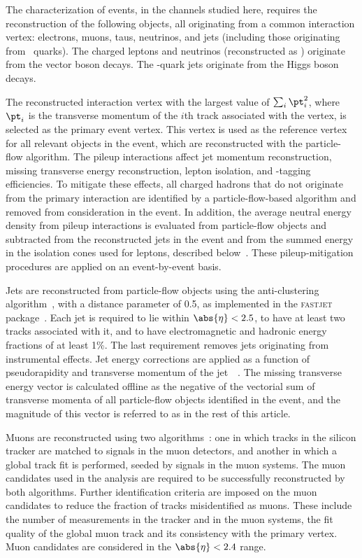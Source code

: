 \documentclass[12pt,twoside,a4paper,cmspaper,final,collab]{cms-tdr}
\begin{document}
The characterization of \VH events, in the channels studied here,
requires the reconstruction of the following objects, all originating from a common interaction vertex:
electrons, muons, taus, neutrinos, and jets (including those originating from \cPqb\ quarks). The charged leptons
and neutrinos (reconstructed as \MET) originate
from the vector boson decays. The \cPqb-quark jets originate from the Higgs boson decays.

The reconstructed interaction vertex with the largest value of
$\sum_i {\pt}_i^2$, where ${\pt}_i$ is the transverse momentum of
the $i$th track associated with the vertex, is selected as the primary event vertex. This vertex is used as the
reference vertex
for all relevant objects in the event, which are reconstructed with
the particle-flow algorithm. The pileup interactions affect jet momentum
reconstruction, missing transverse energy reconstruction,
lepton isolation, and \cPqb-tagging efficiencies.
To mitigate these effects,  all charged hadrons that do not
originate from the primary interaction are identified by a
particle-flow-based algorithm and removed from consideration in the event.
In addition, the average neutral energy density  from pileup interactions is
evaluated  from particle-flow objects and
subtracted from the reconstructed jets in the
event and from the summed energy in the isolation cones used for
leptons, described below~\cite{Cacciari:subtraction}.
These pileup-mitigation procedures are applied on an event-by-event basis.

Jets are reconstructed from particle-flow objects using the
anti-\kt clustering algorithm~\cite{antikt}, with a distance parameter of 0.5,
as implemented in the \textsc{fastjet}
package~\cite{Cacciari:fastjet1,Cacciari:fastjet2}.  Each jet is required to
lie within $\abs{\eta} < 2.5$, to have at least two tracks associated with it,
and to have electromagnetic and hadronic energy fractions of at least
1\%. The last requirement removes jets originating from
instrumental effects. Jet energy corrections are applied as a function of pseudorapidity and
transverse momentum of the jet~~\cite{Chatrchyan:2011ds}. The
missing transverse energy vector is calculated offline as the negative
of the vectorial sum of transverse momenta of all particle-flow objects identified in the
event, and the magnitude of this vector is referred to as \MET in the
rest of this article.

Muons are reconstructed using two algorithms~\cite{Chatrchyan:2012xi}: one in which
tracks in the silicon tracker are matched to signals in the muon
detectors, and another in which a global track fit is performed, seeded by
signals in the muon systems.  The muon
candidates used in the analysis are required to be successfully reconstructed
by both algorithms.  Further identification criteria  are
imposed on the muon candidates to reduce the fraction
of tracks misidentified as muons. These include the number of measurements in the tracker and
in the muon systems,
the fit quality of the global muon track and its consistency with the primary
vertex. Muon candidates are
considered in the  $\abs{\eta} < 2.4$ range.
\end{document}
